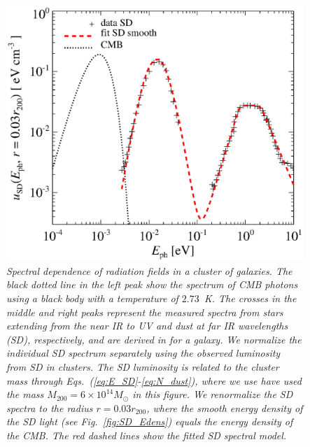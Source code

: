 \documentclass[10pt,aps,pra,reprint,amsmath,amsfonts,amssymb,showpacs,nofootinbib,floatfix]{revtex4-1}
\newcommand{\msun}{M_\odot}
\newcommand{\rvir}{r_{200}}
\newcommand{\mvir}{M_{200}}
\begin{document}
\begin{figure}%
 \includegraphics[width=0.99\columnwidth]{figures/fit.porter.v2.eps}
 \caption{\it Spectral dependence of radiation fields in a cluster of
   galaxies. The black dotted line in the left peak show the spectrum
   of CMB photons using a black body with a temperature of
   $2.73$~K. The crosses in the middle and right peaks represent the
   measured spectra from stars extending from the near IR to UV and
   dust at far IR wavelengths (SD), respectively, and are derived in
   \cite{2006ApJ...648L..29P} for a galaxy. We normalize the
   individual SD spectrum separately using the observed luminosity
   from SD in clusters. The SD luminosity is related to the cluster
   mass through Eqs.~(\ref{eq:E_SD}-\ref{eq:N_dust}), where we use
   have used the mass $\mvir=6\times10^{14}\msun$ in this figure. We
   renormalize the SD spectra to the radius $r=0.03\rvir$, where the
   smooth energy density of the SD light (see Fig.~\ref{fig:SD_Edens})
   equals the energy density of the CMB. The red dashed lines show the
   fitted SD spectral model.}
 \label{fig:SD_spectra}
\end{figure}
\end{document}
